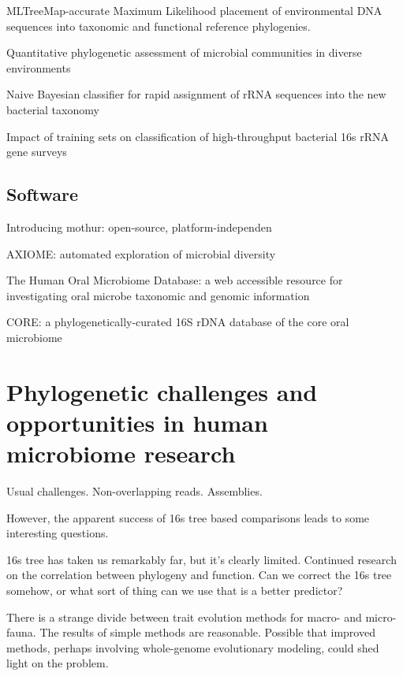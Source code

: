 \documentclass{amsart}
\begin{document}
\cite{stark2010mltreemap}
{{MLTreeMap}-accurate Maximum Likelihood placement of environmental DNA sequences into taxonomic and functional reference phylogenies.}

\cite{vonMeringEaQuantitative08}
{Quantitative phylogenetic assessment of microbial communities in diverse environments}


\cite{huson2007megan}

\cite{wang2007naive}
{Naive Bayesian classifier for rapid assignment of rRNA sequences into the new bacterial taxonomy}

\cite{werner2011impact}
Impact of training sets on classification of high-throughput bacterial 16s rRNA gene surveys



\subsection{Software}
\cite{caporaso2010qiime}

\cite{schloss2009introducing}
Introducing mothur: open-source, platform-independen

\cite{lynch2013axiome}
AXIOME: automated exploration of microbial diversity

\cite{chen2010human}
The Human Oral Microbiome Database: a web accessible resource for investigating oral microbe taxonomic and genomic information

\cite{griffen2011core}
CORE: a phylogenetically-curated 16S rDNA database of the core oral microbiome

\cite{srinivasan2012bacterial}


\section{Phylogenetic challenges and opportunities in human microbiome research}

Usual challenges.
Non-overlapping reads.
Assemblies.

However, the apparent success of 16s tree based comparisons leads to some interesting questions.

16s tree has taken us remarkably far, but it's clearly limited.
Continued research on the correlation between phylogeny and function.
Can we correct the 16s tree somehow, or what sort of thing can we use that is a better predictor?

There is a strange divide between trait evolution methods for macro- and micro-fauna.
The results of simple methods are reasonable.
Possible that improved methods, perhaps involving whole-genome evolutionary modeling, could shed light on the problem.
\end{document}
